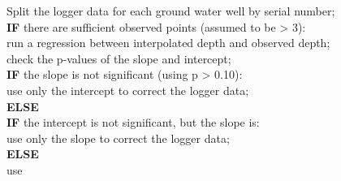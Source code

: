 \documentclass[, manuscript]{copernicus}
\begin{document}
Split the logger data for each ground water well by serial number;\\
\textbf{IF} there are sufficient observed points (assumed to be
\textgreater{} 3):\\
\hspace*{0.333em}\hspace*{0.333em}run a regression between interpolated
depth and observed depth;\\
\hspace*{0.333em}\hspace*{0.333em}check the p-values of the slope and
intercept;\\
\hspace*{0.333em}\hspace*{0.333em}\textbf{IF} the slope is not
significant (using p \textgreater{} 0.10):\\
\hspace*{0.333em}\hspace*{0.333em}\hspace*{0.333em}\hspace*{0.333em}use
only the intercept to correct the logger data;\\
\hspace*{0.333em}\hspace*{0.333em}\textbf{ELSE}\\
\hspace*{0.333em}\hspace*{0.333em}\hspace*{0.333em}\hspace*{0.333em}\hspace*{0.333em}\textbf{IF}
the intercept is not significant, but the slope is:\\
\hspace*{0.333em}\hspace*{0.333em}\hspace*{0.333em}\hspace*{0.333em}\hspace*{0.333em}\hspace*{0.333em}\hspace*{0.333em}use
only the slope to correct the logger data;\\
\hspace*{0.333em}\hspace*{0.333em}\hspace*{0.333em}\hspace*{0.333em}\hspace*{0.333em}\textbf{ELSE}\\
\hspace*{0.333em}\hspace*{0.333em}\hspace*{0.333em}\hspace*{0.333em}\hspace*{0.333em}\hspace*{0.333em}\hspace*{0.333em}use
\end{document}
